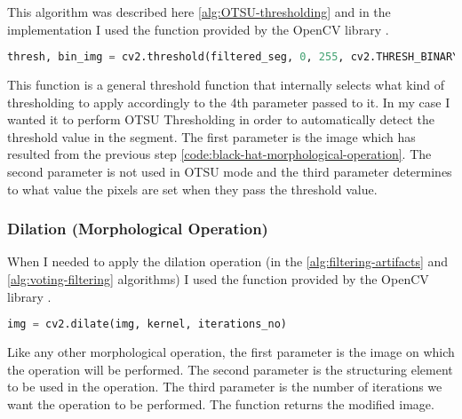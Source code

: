 This algorithm was described here \ref{alg:OTSU-thresholding} and in the implementation I used the function provided by the OpenCV library \cite{site:opencv-OTSU_Thresholding}.

\begin{lstlisting}[language=Python, label=code:OTSU_Thresholding, caption={OTSU Thresholding}]
    thresh, bin_img = cv2.threshold(filtered_seg, 0, 255, cv2.THRESH_BINARY | cv2.THRESH_OTSU)
\end{lstlisting}

This function is a general threshold function that internally selects what kind of thresholding to apply accordingly to the 4th parameter passed to it. In my case I wanted it to perform OTSU Thresholding in order to automatically detect the threshold value in the segment. The first parameter is the image which has resulted from the previous step \ref{code:black-hat-morphological-operation}. The second parameter is not used in OTSU mode and the third parameter determines to what value the pixels are set when they pass the threshold value.

\subsubsection{Dilation (Morphological Operation)}

When I needed to apply the dilation operation (in the \ref{alg:filtering-artifacts} and \ref{alg:voting-filtering} algorithms) I used the function provided by the OpenCV library \cite{site:opencv-dilate-operation}.

\begin{lstlisting}[language=Python, label=code:dilation-morphological-operation, caption={Dilation}]
    img = cv2.dilate(img, kernel, iterations_no)
\end{lstlisting}

Like any other morphological operation, the first parameter is the image on which the operation will be performed. The second parameter is the structuring element to be used in the operation. The third parameter is the number of iterations we want the operation to be performed. The function returns the modified image.

